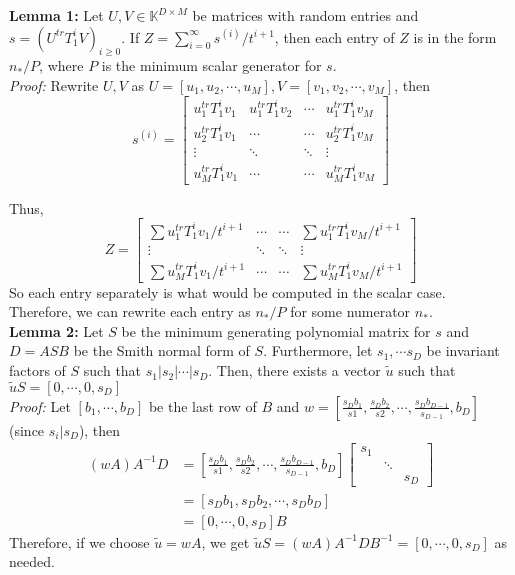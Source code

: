 \documentclass[12pt]{article}
\begin{document}
\noindent\textbf{Lemma 1:} Let $U,V \in \mathbb{K}^{D\times M}$
be matrices with random entries and $s = (U^{tr}T_1^iV)_{i \ge 0}$. If 
$Z = \sum_{i = 0}^{\infty} s^{(i)}/ t^{i+1}$, then each entry of $Z$ is
in the form $n_*/P$, where $P$ is the minimum scalar generator for
$s$.\\

\noindent\textit{Proof:} Rewrite $U,V$ as 
$U = [u_1,u_2,\cdots,u_M], V= [v_1,v_2,\cdots,v_M]$, then 
$$s^{(i)} = 
\begin{bmatrix}
u_1^{tr}T_1^iv_1 & u_1^{tr}T_1^iv_2 & \cdots   & u_1^{tr}T_1^iv_M \\
u_2^{tr}T_1^iv_1 & \cdots           & \cdots   & u_2^{tr}T_1^iv_M \\
\vdots           & \ddots           & \ddots   & \vdots \\
u_M^{tr}T_1^iv_1 & \cdots           & \cdots   & u_M^{tr}T_1^iv_M
\end{bmatrix}$$

Thus, 	
$$ Z = 
\begin{bmatrix}
\sum u_1^{tr}T_1^iv_1/t^{i+1} & \cdots  & \cdots & \sum u_1^{tr}T_1^iv_M/t^{i+1} \\
\vdots                        & \ddots  & \ddots & \vdots \\
\sum u_M^{tr}T_1^iv_1/t^{i+1} & \cdots  & \cdots & \sum u_M^{tr}T_1^iv_M/t^{i+1}
\end{bmatrix}$$
So each entry separately is what would be computed in the scalar case. Therefore,
we can rewrite each entry as $n_*/P$ for some numerator $n_*$.\\

\noindent\textbf{Lemma 2:} Let $S$ be the minimum generating polynomial matrix for $s$
and $D = ASB$ be the Smith normal form of $S$. Furthermore, let $s_1, \cdots s_D$ be
invariant factors of $S$ such that $s_1 | s_2 | \cdots | s_D$. Then, there exists a vector $\tilde{u}$
such that $\tilde{u} S = [0, \cdots, 0, s_D]$\\

\noindent\textit{Proof:} Let $[b_1,\cdots,b_D]$ be the last row of $B$ and 
$w = [\frac{s_Db_1}{s1},\frac{s_Db_2}{s2},\cdots,\frac{s_Db_{D-1}}{s_{D-1}},b_D]$ (since $s_i | s_D$), then
\begin{align*}
	(w A) A^{-1} D &=  [\frac{s_Db_1}{s1},\frac{s_Db_2}{s2},\cdots,\frac{s_Db_{D-1}}{s_{D-1}},b_D]
	\begin{bmatrix}
	s_1 &        & \\
	    & \ddots & \\
	    &        & s_D
	\end{bmatrix}\\
	    &= [s_Db_1, s_Db_2, \cdots, s_Db_D]\\
	    &= [0,\cdots,0,s_D] B
\end{align*}
Therefore, if we choose $\tilde{u} = w A$, we get
$ \tilde{u} S = (w A) A^{-1} D B^{-1} = [0,\cdots,0,s_D]$ as needed.\\
\end{document}
